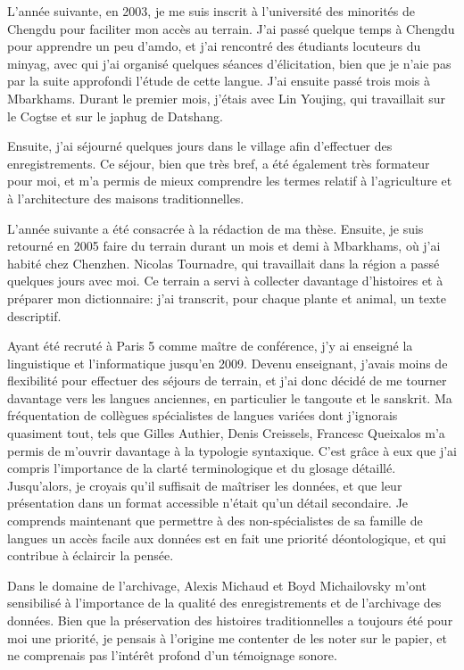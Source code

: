 \documentclass[oldfontcommands,oneside,a4paper,11pt]{memoir}
\begin{document}
L'année suivante, en 2003, je me suis inscrit à l'université des minorités de Chengdu pour faciliter mon accès au terrain. J'ai passé quelque temps à Chengdu pour apprendre un peu d'amdo, et j'ai rencontré des étudiants locuteurs du minyag, avec qui j'ai organisé  quelques séances d'élicitation, bien que je n'aie pas par la suite approfondi l'étude de cette langue. J'ai ensuite passé trois mois à Mbarkhams. Durant le premier mois, j'étais avec Lin Youjing, qui travaillait sur le Cogtse et sur le japhug de Datshang.  

Ensuite, j'ai séjourné quelques jours dans le village afin d'effectuer des enregistrements. Ce séjour, bien que très bref, a été également très formateur pour moi, et m'a permis de mieux comprendre les termes relatif à l'agriculture et à l'architecture des maisons traditionnelles.

L'année suivante a été consacrée à la rédaction de ma thèse. Ensuite, je suis retourné en 2005 faire du terrain durant un mois et demi à Mbarkhams, où j'ai habité chez Chenzhen. Nicolas Tournadre, qui travaillait dans la région a passé quelques jours avec moi. Ce terrain a servi à collecter davantage d'histoires et à préparer mon dictionnaire: j'ai transcrit, pour chaque plante et animal, un texte descriptif.

Ayant été recruté à Paris 5 comme maître de conférence, j'y ai enseigné la linguistique et l'informatique jusqu'en 2009. Devenu enseignant, j'avais moins de flexibilité pour effectuer des séjours de terrain, et j'ai donc décidé de me tourner davantage vers les langues anciennes, en particulier le tangoute et le sanskrit. Ma fréquentation de collègues spécialistes de langues variées dont j'ignorais quasiment tout, tels que Gilles Authier, Denis Creissels, Francesc Queixalos m'a permis de m'ouvrir davantage à la typologie syntaxique. C'est grâce à eux que j'ai compris l'importance de la clarté terminologique et du glosage détaillé. Jusqu'alors, je croyais qu'il suffisait de maîtriser les données, et que leur présentation dans un format accessible n'était qu'un détail secondaire. Je comprends maintenant que permettre à des non-spécialistes de sa famille de langues   un accès facile aux données est en fait une priorité déontologique, et qui contribue à   éclaircir la pensée.

Dans le domaine de l'archivage, Alexis Michaud et Boyd Michailovsky m'ont sensibilisé  à l'importance de la qualité des enregistrements et de l'archivage des données. Bien que la préservation des histoires traditionnelles a toujours été pour moi une priorité, je pensais à l'origine me contenter de les noter sur le papier, et ne comprenais pas l'intérêt profond d'un témoignage sonore. 
\end{document}
